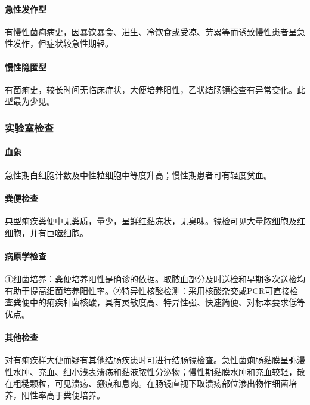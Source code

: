 \paragraph{急性发作型}

有慢性菌痢病史，因暴饮暴食、进生、冷饮食或受凉、劳累等而诱致慢性患者呈急性发作，但症状较急性期轻。

\paragraph{慢性隐匿型}

有菌痢史，较长时间无临床症状，大便培养阳性，乙状结肠镜检查有异常变化。此型最为少见。

\subsubsection{实验室检查}

\paragraph{血象}

急性期白细胞计数及中性粒细胞中等度升高；慢性期患者可有轻度贫血。

\paragraph{粪便检查}

典型痢疾粪便中无粪质，量少，呈鲜红黏冻状，无臭味。镜检可见大量脓细胞及红细胞，并有巨噬细胞。

\paragraph{病原学检查}

①细菌培养：粪便培养阳性是确诊的依据。取脓血部分及时送检和早期多次送检均有助于提高细菌培养阳性率。②特异性核酸检测：采用核酸杂交或PCR可直接检查粪便中的痢疾杆菌核酸，具有灵敏度高、特异性强、快速简便、对标本要求低等优点。

\paragraph{其他检查}

对有痢疾样大便而疑有其他结肠疾患时可进行结肠镜检查。急性菌痢肠黏膜呈弥漫性水肿、充血、细小浅表溃疡和黏液脓性分泌物；慢性期黏膜水肿和充血较轻，散在粗糙颗粒，可见溃疡、瘢痕和息肉。在肠镜直视下取溃疡部位渗出物作细菌培养，阳性率高于粪便培养。

